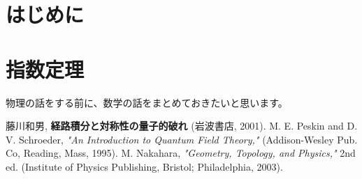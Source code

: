 \documentclass[unicode,a4paper,10pt]{ltjsarticle}
\begin{document}
\maketitle
\tableofcontents

\clearpage
\section{はじめに}





\clearpage
\section{指数定理}

物理の話をする前に、数学の話をまとめておきたいと思います。


























\clearpage
\begin{thebibliography}{99}
  藤川和男, \textbf{経路積分と対称性の量子的破れ} (岩波書店, 2001).
  M. E. Peskin and D. V. Schroeder, \textit{"An Introduction to Quantum Field Theory,"} (Addison-Wesley Pub. Co, Reading, Mass, 1995).
  M. Nakahara, \textit{"Geometry, Topology, and Physics,"} 2nd ed. (Institute of Physics Publishing, Bristol; Philadelphia, 2003).
\end{thebibliography}







% 
% 


\end{document}
